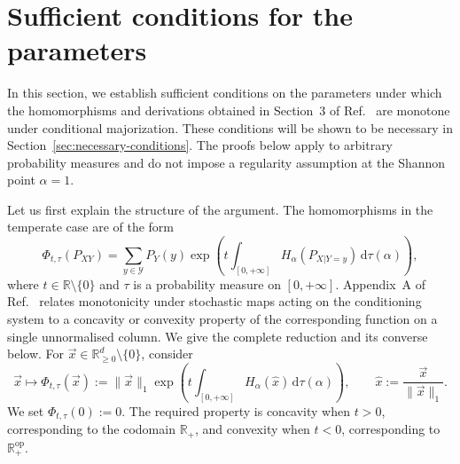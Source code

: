 \documentclass[aps,pra,11pt,onecolumn,nofootinbib,tightenlines]{revtex4-2}
\theoremstyle{definition}
\begin{document}
\setcounter{section}{3}
\section{Sufficient conditions for the parameters}
\label{sec:sufficient-conditions}

In this section, we establish sufficient conditions on the parameters under which the homomorphisms and derivations obtained in Section~3 of Ref.~\cite{rubboli2026complete} are monotone under conditional majorization. These conditions will be shown to be necessary in Section~\ref{sec:necessary-conditions}. The proofs below apply to arbitrary probability measures and do not impose a regularity assumption at the Shannon point $\alpha=1$.

Let us first explain the structure of the argument. The homomorphisms in the temperate case are of the form
\begin{equation}
 \Phi_{t,\tau}(P_{XY})
 =\sum_{y\in\mathcal Y}P_Y(y)
  \exp\!\left(
    t\int_{[0,+\infty]}H_\alpha(P_{X|Y=y})\,\mathrm d\tau(\alpha)
  \right),
 \label{eq:temperate-homomorphism-section4}
\end{equation}
where $t\in\mathbb R\setminus\{0\}$ and $\tau$ is a probability measure on $[0,+\infty]$. Appendix~A of Ref.~\cite{rubboli2026complete} relates monotonicity under stochastic maps acting on the conditioning system to a concavity or convexity property of the corresponding function on a single unnormalised column. We give the complete reduction and its converse below. For $\vec x\in\mathbb R^d_{\geq0}\setminus\{0\}$, consider
\begin{equation}
 \vec x\longmapsto
 \Phi_{t,\tau}(\vec x)
 :=\|\vec x\|_1
 \exp\!\left(
   t\int_{[0,+\infty]}H_\alpha(\widehat x)\,\mathrm d\tau(\alpha)
 \right),
 \qquad
 \widehat x:=\frac{\vec x}{\|\vec x\|_1}.
 \label{eq:single-column-Phi}
\end{equation}
We set $\Phi_{t,\tau}(0):=0$. The required property is concavity when $t>0$, corresponding to the codomain $\mathbb R_+$, and convexity when $t<0$, corresponding to $\mathbb R_+^{\mathrm{op}}$.
\end{document}
